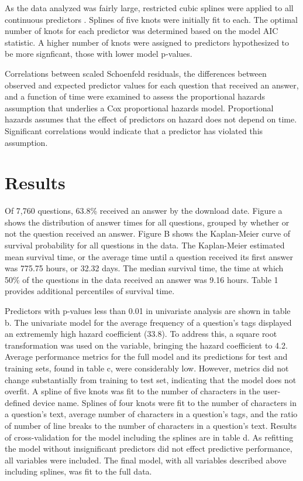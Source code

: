 \documentclass[12pt]{article}
\begin{document}
As the data analyzed was fairly large, restricted cubic splines were applied to all continuous predictors \citep{Harrell2015}. Splines of five knots were initially fit to each. The optimal number of knots for each predictor was determined based on the model AIC statistic. A higher number of knots were assigned to predictors hypothesized to be more signficant, those with lower model p-values.

Correlations between scaled Schoenfeld residuals, the differences between observed and expected predictor values for each question that received an answer, and a function of time were examined to assess the proportional hazards assumption that underlies a Cox proportional hazards model. Proportional hazards assumes that the effect of predictors on hazard does not depend on time. Significant correlations would indicate that a predictor has violated this assumption. 


\section{Results} 

  Of 7,760 questions, 63.8\% received an answer by the download date. Figure a shows the distribution of answer times for all questions, grouped by whether or not the question received an answer. Figure B shows the Kaplan-Meier curve of survival probability for all questions in the data. The Kaplan-Meier estimated mean survival time, or the average time until a question received its first answer was 775.75 hours, or 32.32 days. The median survival time, the time at which 50\% of the questions in the data received an answer was 9.16 hours. Table 1 provides additional percentiles of survival time. 

Predictors with p-values less than 0.01 in univariate analysis are shown in table b. The univariate model for the average frequency of a question's tags displayed an extrememly high hazard coefficient (33.8). To address this, a square root transformation was used on the variable, bringing the hazard coefficient to 4.2. Average performance metrics for the full model and its predictions for test and training sets, found in table c, were considerably low. However, metrics did not change substantially from training to test set, indicating that the model does not overfit. A spline of five knots was fit to the number of characters in the user-defined device name. Splines of four knots were fit to the number of characters in a question's text, average number of characters in a question's tags, and the ratio of number of line breaks to the number of characters in a question's text. Results of cross-validation for the model including the splines are in table d. As refitting the model without insignificant predictors did not effect predictive performance, all variables were included. The final model, with all variables described above including splines, was fit to the full data.  
\end{document}
